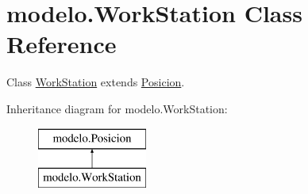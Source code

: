 \hypertarget{classmodelo_1_1_work_station}{}\section{modelo.\+Work\+Station Class Reference}
\label{classmodelo_1_1_work_station}


Class \mbox{\hyperlink{classmodelo_1_1_work_station}{Work\+Station}} extends \mbox{\hyperlink{classmodelo_1_1_posicion}{Posicion}}.  


Inheritance diagram for modelo.\+Work\+Station\+:\begin{figure}[H]
\begin{center}
\leavevmode
\includegraphics[height=2.000000cm]{classmodelo_1_1_work_station}
\end{center}
\end{figure}
